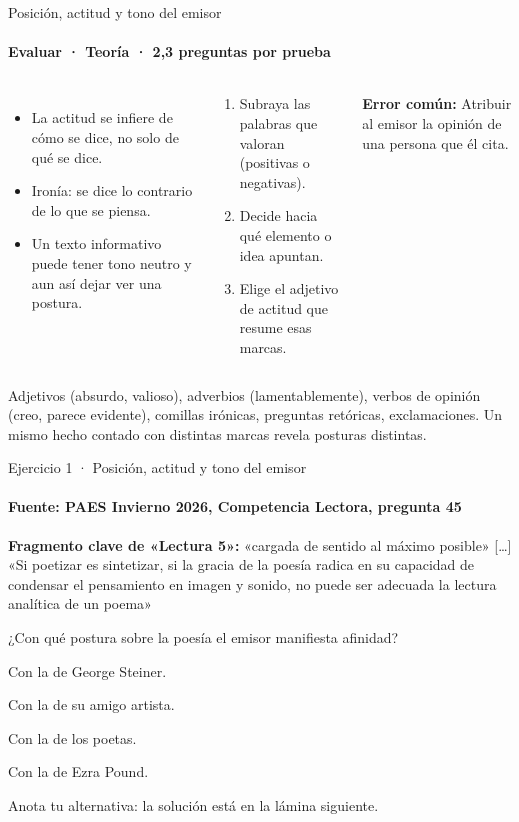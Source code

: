 \documentclass[aspectratio=169,11pt]{beamer}
\newcommand{\alternativa}[2]{\begin{opcion}\tecla{#1}\hspace{0.6em}#2\end{opcion}}
\newlength{\ajustealto}
\newenvironment{ajustar}[1][0.74\textheight]
  {\setlength{\ajustealto}{#1}\begin{lrbox}{\ajustecaja}\begin{minipage}{\textwidth}}
  {\end{minipage}\end{lrbox}%
   \ifdim\dimexpr\ht\ajustecaja+\dp\ajustecaja\relax>\ajustealto
     \resizebox*{!}{\ajustealto}{\usebox{\ajustecaja}}\else\usebox{\ajustecaja}\fi}
\begin{document}
\begin{frame}{Posición, actitud y tono del emisor}
\label{tema-cl-postura}
\framesubtitle{Evaluar · Teoría · 2,3 preguntas por prueba}
\begin{ajustar}
\begin{columns}[T,onlytextwidth]
\begin{itemize}\footnotesize
\item La actitud se infiere de cómo se dice, no solo de qué se dice.
\item Ironía: se dice lo contrario de lo que se piensa.
\item Un texto informativo puede tener tono neutro y aun así dejar ver una postura.
\end{itemize}
\begin{cajaregla}\scriptsize \begin{enumerate}\item Subraya las palabras que valoran (positivas o negativas).\item Decide hacia qué elemento o idea apuntan.\item Elige el adjetivo de actitud que resume esas marcas.\end{enumerate}\end{cajaregla}
\begin{notagris}\scriptsize \textbf{Error común:} Atribuir al emisor la opinión de una persona que él cita.\end{notagris}
\end{columns}
\begin{cajaclave}\footnotesize
Adjetivos (absurdo, valioso), adverbios (lamentablemente), verbos de opinión (creo, parece evidente), comillas irónicas, preguntas retóricas, exclamaciones. Un mismo hecho contado con distintas marcas revela posturas distintas.
\end{cajaclave}
\end{ajustar}
\end{frame}

\begin{frame}{Ejercicio 1 · Posición, actitud y tono del emisor}
\framesubtitle{Fuente: PAES Invierno 2026, Competencia Lectora, pregunta 45}
\begin{ajustar}[0.7\textheight]
\begin{notagris}\scriptsize \textbf{Fragmento clave de «Lectura 5»:} «cargada de sentido al máximo posible» [\ldots] «Si poetizar es sintetizar, si la gracia de la poesía radica en su capacidad de condensar el pensamiento en imagen y sonido, no puede ser adecuada la lectura analítica de un poema»\end{notagris}
{\small ¿Con qué postura sobre la poesía el emisor manifiesta afinidad?}
\vspace{0.4em}
\alternativa{A}{Con la de George Steiner.}
\alternativa{B}{Con la de su amigo artista.}
\alternativa{C}{Con la de los poetas.}
\alternativa{D}{Con la de Ezra Pound.}
\end{ajustar}
\vfill{\tiny\color{zinc500}\hfill Anota tu alternativa: la solución está en la lámina siguiente.}
\end{frame}
\end{document}
